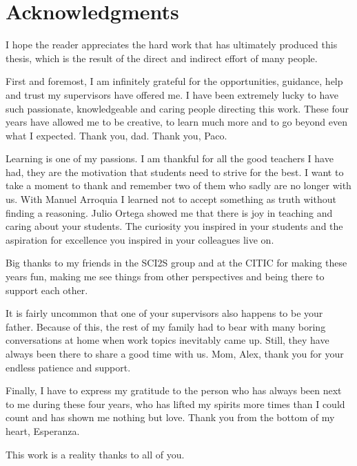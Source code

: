 \chapter*{Acknowledgments}


I hope the reader appreciates the hard work that has ultimately produced this thesis, which is the result of the direct and indirect effort of many people. 

First and foremost, I am infinitely grateful for the opportunities, guidance, help and trust my supervisors have offered me. I have been extremely lucky to have such passionate, knowledgeable and caring people directing this work. These four years have allowed me to be creative, to learn much more and to go beyond even what I expected. Thank you, dad. Thank you, Paco.

Learning is one of my passions. I am thankful for all the good teachers I have had, they are the motivation that students need to strive for the best. I want to take a moment to thank and remember two of them who sadly are no longer with us. With Manuel Arroquia I learned not to accept something as truth without finding a reasoning. Julio Ortega showed me that there is joy in teaching and caring about your students. The curiosity you inspired in your students and the aspiration for excellence you inspired in your colleagues live on.

Big thanks to my friends in the SCI2S group and at the CITIC for making these years fun, making me see things from other perspectives and being there to support each other.

It is fairly uncommon that one of your supervisors also happens to be your father. Because of this, the rest of my family had to bear with many boring conversations at home when work topics inevitably came up. Still, they have always been there to share a good time with us. Mom, Alex, thank you for your endless patience and support.

Finally, I have to express my gratitude to the person who has always been next to me during these four years, who has lifted my spirits more times than I could count and has shown me nothing but love. Thank you from the bottom of my heart, Esperanza.

This work is a reality thanks to all of you.


